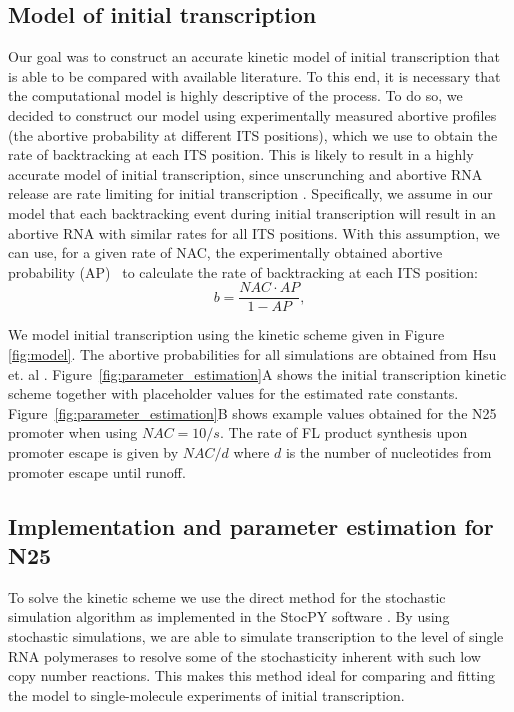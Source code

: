 %
\subsection{Model of initial transcription}
Our goal was to construct an accurate kinetic model of initial transcription
that is able to be compared with available literature. To this end, it is
necessary that the computational model is highly descriptive of the process.
To do so, we decided to construct our model using experimentally measured
abortive profiles (the abortive probability at different ITS positions), which
we use to obtain the rate of backtracking at each ITS position. This is likely
to result in a highly accurate model of initial transcription, since
unscrunching and abortive RNA release are rate limiting for initial
transcription \cite{revyakin_abortive_2006}. Specifically, we assume in our
model that each backtracking event during initial transcription will result in
an abortive RNA with similar rates for all ITS positions. With this
assumption, we can use, for a given rate of NAC, the experimentally obtained
abortive probability (AP)~\cite{hsu_quantitative_1996} to calculate the rate
of backtracking at each ITS position:
\begin{equation*}
    b = \frac{NAC\cdot AP}{1-AP},
\end{equation*}

We model initial transcription using the kinetic scheme given in Figure
\ref{fig:model}. The abortive probabilities for all simulations are obtained
from Hsu et. al \cite{hsu_initial_2006}.
Figure~\ref{fig:parameter_estimation}A shows the initial transcription kinetic
scheme together with placeholder values for the estimated rate constants.
Figure~\ref{fig:parameter_estimation}B shows example values obtained for the
N25 promoter when using $NAC=10/s$. The rate of FL product synthesis upon
promoter escape is given by $NAC/d$ where $d$ is the number of nucleotides from
promoter escape until runoff.

\subsection{Implementation and parameter estimation for N25}
To solve the kinetic scheme we use the direct method for the stochastic
simulation algorithm \cite{gillespie_exact_1977} as implemented in the StocPY
software \cite{maarleveld_stochpy:_2013}. By using stochastic simulations, we
are able to simulate transcription to the level of single RNA polymerases to
resolve some of the stochasticity inherent with such low copy number
reactions. This makes this method ideal for comparing and fitting the model to
single-molecule experiments of initial transcription.

